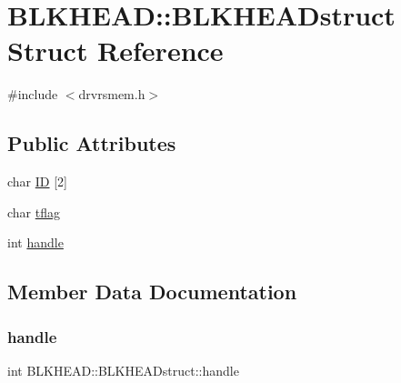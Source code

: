 \hypertarget{struct_b_l_k_h_e_a_d_1_1_b_l_k_h_e_a_dstruct}{}\section{B\+L\+K\+H\+E\+AD\+:\+:B\+L\+K\+H\+E\+A\+Dstruct Struct Reference}
\label{struct_b_l_k_h_e_a_d_1_1_b_l_k_h_e_a_dstruct}


{\ttfamily \#include $<$drvrsmem.\+h$>$}

\subsection*{Public Attributes}
\begin{DoxyCompactItemize}
\item 
char \hyperlink{struct_b_l_k_h_e_a_d_1_1_b_l_k_h_e_a_dstruct_a98e68666a5a01d0098e50da74390ae5a}{ID} \mbox{[}2\mbox{]}
\item 
char \hyperlink{struct_b_l_k_h_e_a_d_1_1_b_l_k_h_e_a_dstruct_a6516dba275037acb41fd46bd9db6abc1}{tflag}
\item 
int \hyperlink{struct_b_l_k_h_e_a_d_1_1_b_l_k_h_e_a_dstruct_aa69b5abb29260bea44e82d81728fb6d4}{handle}
\end{DoxyCompactItemize}


\subsection{Member Data Documentation}
\mbox{\label{struct_b_l_k_h_e_a_d_1_1_b_l_k_h_e_a_dstruct_aa69b5abb29260bea44e82d81728fb6d4}} 
\subsubsection{\texorpdfstring{handle}{handle}}
{\footnotesize\ttfamily int B\+L\+K\+H\+E\+A\+D\+::\+B\+L\+K\+H\+E\+A\+Dstruct\+::handle}

\mbox{\label{struct_b_l_k_h_e_a_d_1_1_b_l_k_h_e_a_dstruct_a98e68666a5a01d0098e50da74390ae5a}} 
